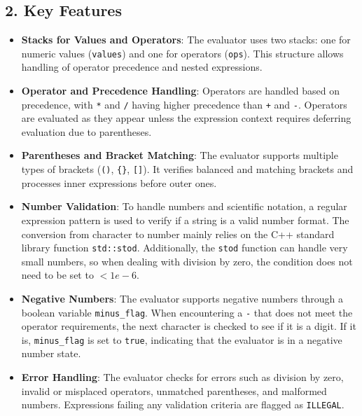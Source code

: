 \documentclass[a4paper]{article}
\begin{document}
\subsection*{2. Key Features}
\begin{itemize}
    \item \textbf{Stacks for Values and Operators}: The evaluator uses two stacks: one for numeric values (\texttt{values}) and one for operators (\texttt{ops}). This structure allows handling of operator precedence and nested expressions.
    \item \textbf{Operator and Precedence Handling}: Operators are handled based on precedence, with \texttt{*} and \texttt{/} having higher precedence than \texttt{+} and \texttt{-}. Operators are evaluated as they appear unless the expression context requires deferring evaluation due to parentheses.
    \item \textbf{Parentheses and Bracket Matching}: The evaluator supports multiple types of brackets (\texttt{()}, \texttt{\{\}}, \texttt{[]}). It verifies balanced and matching brackets and processes inner expressions before outer ones.
    \item \textbf{Number Validation}: To handle numbers and scientific notation, a regular expression pattern is used to verify if a string is a valid number format. The conversion from character to number mainly relies on the C++ standard library function \texttt{std::stod}. Additionally, the \texttt{stod} function can handle very small numbers, so when dealing with division by zero, the condition does not need to be set to $< 1e-6$.
    \item \textbf{Negative Numbers}: The evaluator supports negative numbers through a boolean variable \texttt{minus\_flag}. When encountering a \texttt{-} that does not meet the operator requirements, the next character is checked to see if it is a digit. If it is, \texttt{minus\_flag} is set to \texttt{true}, indicating that the evaluator is in a negative number state.
    \item \textbf{Error Handling}: The evaluator checks for errors such as division by zero, invalid or misplaced operators, unmatched parentheses, and malformed numbers. Expressions failing any validation criteria are flagged as \texttt{ILLEGAL}.
\end{itemize}
\end{document}
